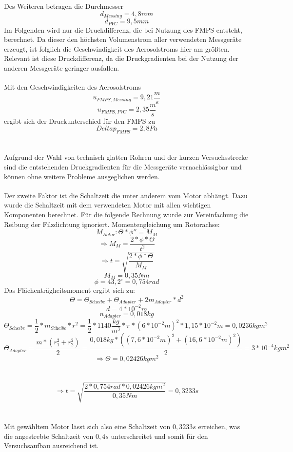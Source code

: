 Des Weiteren betragen die Durchmesser
\[d_{Messing} = 4,8 mm\]
\[d_{PVC} = 9,5 mm\]
Im Folgenden wird nur die Druckdifferenz, die bei Nutzung des  FMPS entsteht, berechnet. Da dieser den h\"{o}chsten Volumenstrom aller verwendeten Messger\"{a}te erzeugt, ist folglich die Geschwindigkeit des Aerosolstroms hier am gr\"{o}{\ss}ten. Relevant ist diese Druckdifferenz, da die Druckgradienten bei der Nutzung der anderen Messger\"{a}te geringer ausfallen.
\\\\
Mit den Geschwindigkeiten des Aerosolstroms \[u_{FMPS, Messing} = 9,21 \frac{m}{s}\] \[u_{FMPS, PVC} = 2,35 \frac{m}{s}\] ergibt sich der Druckunterschied f\"{u}r den FMPS zu \[Delta p_{FMPS} = 2,8 Pa\]
\\\\
Aufgrund der Wahl von technisch glatten Rohren und der kurzen Versuchsstrecke sind die entstehenden Druckgradienten f\"{u}r die Messger\"{a}te vernachl\"{a}ssigbar und k\"{o}nnen ohne weitere Probleme ausgeglichen werden.
\\\\
Der zweite Faktor ist die Schaltzeit die unter anderem vom Motor abh\"{a}ngt. Dazu wurde die Schaltzeit mit dem verwendeten Motor mit allen wichtigen Komponenten berechnet. F\"{u}r die folgende Rechnung wurde zur Vereinfachung die Reibung der Filzdichtung ignoriert.
Momentengleichung um Rotorachse:
\[M_\textit{Rotor}: \Theta * \phi'' = M_M\]
\[\Rightarrow M_M = \frac{2*\phi*\Theta}{t^2}\]
\[\Rightarrow t = \sqrt{\frac{2*\phi*\Theta}{M_M}}\]
\[M_M = 0,35Nm\]
\[\phi = 43,2^\circ = 0,754 \textit{rad}\]
Das Fl\"{a}chentr\"{a}gheitsmoment ergibt sich zu:
\[\Theta = \Theta_\textit{Scheibe} + \Theta_{Adapter} + 2m_\textit{Adapter} * d^2\]
\[d = 4 * 10^{-2}m\]
\[n_\textit{Adapter} = 0,018kg\]
\[\Theta_\textit{Scheibe} = \frac{1}{2}*m_\textit{Scheibe} * r^2 = \frac{1}{2} * 1140\frac{kg}{m^3}*\pi *(6*10^{-2}m)^2 * 1,15 * 10^{-2}m = 0,0236kgm^2\]
\[\Theta_\textit{Adapter} = \frac{m*(r_1^2+r_2^2)}{2} = \frac{0,018kg * ((7,6*10^{-2}m)^2+(16,6*10^{-2}m)^2)}{2} = 3*10^{-4}kgm^2\]
\[\Rightarrow \Theta = 0,02426kgm^2\]
\\\\
\[\Rightarrow t = \sqrt{\frac{2*0,754\textit{rad}*0,02426 kgm^2}{0,35Nm}} = 0,3233s\]
\\\\
Mit gew\"{a}hltem Motor l\"{a}sst sich also eine Schaltzeit von \(0,3233s\) erreichen, was die angestrebte Schaltzeit von \(0,4s\) unterschreitet und somit f\"{u}r den Versuchsaufbau ausreichend ist.\\

